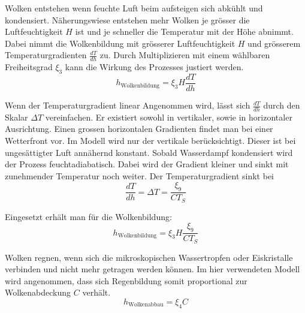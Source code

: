 \begin{refsection}
Wolken entstehen wenn feuchte Luft beim aufsteigen sich abkühlt und kondensiert. Näherungswiese entstehen mehr Wolken je grösser die Luftfeuchtigkeit $H$ ist und je schneller die Temperatur mit der Höhe abnimmt.
Dabei nimmt die Wolkenbildung mit grösserer Luftfeuchtigkeit $H$ und grösserem Temperaturgradienten $\frac{dT}{dh}$ zu. Durch Multiplizieren mit einem wählbaren Freiheitsgrad $\xi_3$ kann die Wirkung des Prozesses justiert werden. 
\begin{equation}
h_{\text{Wolkenbildung}} = \xi_3 H \frac{dT}{dh}
\end{equation}

Wenn der Temperaturgradient linear Angenommen wird, lässt sich $\frac{dT}{dh}$ durch den Skalar $\Delta T $ vereinfachen.
Er existiert sowohl in vertikaler, sowie in horizontaler Ausrichtung. Einen grossen horizontalen Gradienten findet man bei einer Wetterfront vor. Im Modell wird nur der vertikale berücksichtigt. Dieser ist bei ungesättigter Luft annähernd konstant. Sobald Wasserdampf kondensiert wird der Prozess feuchtadiabatisch. Dabei wird der Gradient kleiner und sinkt mit zunehmender Temperatur noch weiter.
Der Temperaturgradient sinkt bei 
\begin{equation}
\frac{dT}{dh} = \Delta T = \frac{\xi_9}{C T_S} 
\end{equation}

Eingesetzt erhält man für die Wolkenbildung:
\begin{equation}
h_{\text{Wolkenbildung}} = \xi_3 H \frac{\xi_9}{C T_S}
\end{equation}

Wolken regnen, wenn sich die mikroskopischen Wassertropfen oder Eiskristalle verbinden und nicht mehr getragen werden können. Im hier verwendeten Modell wird angenommen, dass sich Regenbildung somit proportional zur Wolkenabdeckung $C$ verhält.
\begin{equation}
h_{\text{Wolkenabbau}} = \xi_4 C
\end{equation}

%



\end{refsection}
